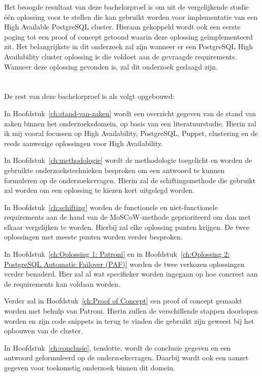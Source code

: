 Het beoogde resultaat van deze bachelorproef is om uit de vergelijkende studie één oplossing voor te stellen die kan gebruikt worden voor implementatie van een High Available PostgreSQL cluster. Hieraan gekoppeld wordt ook een eerste poging tot een proof of concept getoond waarin deze oplossing geïmplementeerd zit. Het belangrijkste in dit onderzoek zal zijn wanneer er een PostgreSQL High Availability cluster oplossing is die voldoet aan de gevraagde requirements. Wanneer deze oplossing gevonden is, zal dit onderzoek geslaagd zijn.


\section{}
\label{sec:opzet-bachelorproef}


De rest van deze bachelorproef is als volgt opgebouwd:

In Hoofdstuk~\ref{ch:stand-van-zaken} wordt een overzicht gegeven van de stand van zaken binnen het onderzoeksdomein, op basis van een literatuurstudie. Hierin zal ik mij vooral focussen op High Availability, PostgreSQL, Puppet, clustering en de reeds aanwezige oplossingen voor High Availability.

In Hoofdstuk~\ref{ch:methodologie} wordt de methodologie toegelicht en worden de gebruikte onderzoekstechnieken besproken om een antwoord te kunnen formuleren op de onderzoeksvragen. Hierin zal de schiftingsmethode die gebruikt zal worden om een oplossing te kiezen kort uitgelegd worden.

In Hoofdstuk~\ref{ch:schifting} worden de functionele en niet-functionele requirements aan de hand van de MoSCoW-methode geprioriteerd om dan met elkaar vergelijken te worden. Hierbij zal elke oplossing punten krijgen. De twee oplossingen met meeste punten worden verder besproken.

In Hoofdstuk~\ref{ch:Oplossing 1: Patroni} en in Hoofdstuk~\ref{ch:Oplossing 2: PostgreSQL Automatic Failover (PAF)} worden de twee verkozen oplossingen verder benaderd. Hier zal al wat specifieker worden ingegaan op hoe concreet aan de requirements kan voldaan worden.

Verder zal in Hoofdstuk~\ref{ch:Proof of Concept} een proof of concept gemaakt worden met behulp van Patroni. Hierin zullen de verschillende stappen doorlopen worden en zijn code snippets in terug te vinden die gebruikt zijn geweest bij het opbouwen van de cluster.

In Hoofdstuk~\ref{ch:conclusie}, tenslotte, wordt de conclusie gegeven en een antwoord geformuleerd op de onderzoeksvragen. Daarbij wordt ook een aanzet gegeven voor toekomstig onderzoek binnen dit domein.
